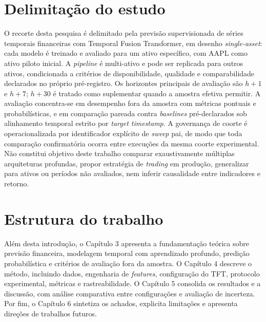 \section{Delimitação do estudo}
O recorte desta pesquisa é delimitado pela previsão supervisionada de séries temporais financeiras com Temporal Fusion Transformer, em desenho \textit{single-asset}: cada modelo é treinado e avaliado para um ativo específico, com AAPL como ativo piloto inicial. A \textit{pipeline} é multi-ativo e pode ser replicada para outros ativos, condicionada a critérios de disponibilidade, qualidade e comparabilidade declarados no próprio pré-registro. Os horizontes principais de avaliação são \(h+1\) e \(h+7\); \(h+30\) é tratado como suplementar quando a amostra efetiva permitir. A avaliação concentra-se em desempenho fora da amostra com métricas pontuais e probabilísticas, e em comparação pareada contra \textit{baselines} pré-declarados sob alinhamento temporal estrito por \textit{target timestamp}. A governança de coorte é operacionalizada por identificador explícito de \textit{sweep} pai, de modo que toda comparação confirmatória ocorra entre execuções da mesma coorte experimental. Não constitui objetivo deste trabalho comparar exaustivamente múltiplas arquiteturas profundas, propor estratégia de \textit{trading} em produção, generalizar para ativos ou períodos não avaliados, nem inferir causalidade entre indicadores e retorno.

\section{Estrutura do trabalho}
Além desta introdução, o Capítulo 3 apresenta a fundamentação teórica sobre previsão financeira, modelagem temporal com aprendizado profundo, predição probabilística e critérios de avaliação fora da amostra. O Capítulo 4 descreve o método, incluindo dados, engenharia de \textit{features}, configuração do TFT, protocolo experimental, métricas e rastreabilidade. O Capítulo 5 consolida os resultados e a discussão, com análise comparativa entre configurações e avaliação de incerteza. Por fim, o Capítulo 6 sintetiza os achados, explicita limitações e apresenta direções de trabalhos futuros.
